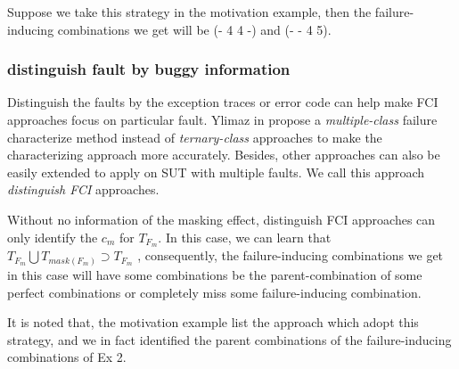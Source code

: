 \documentclass{sig-alternate}
\begin{document}
Suppose we take this strategy in the motivation example, then the failure-inducing combinations we get will be (- 4 4 -) and (- - 4 5).

\subsubsection{distinguish fault by buggy information}
Distinguish the faults by the exception traces or error code can help make FCI approaches focus on particular fault. Ylimaz in  \cite{yilmaz2013reducing} propose a \emph{multiple-class} failure characterize method instead of \emph{ternary-class} approaches to make the characterizing approach more accurately. Besides, other approaches can also be easily extended to apply on SUT with multiple faults. We call this approach \emph{distinguish FCI} approaches.

Without no information of the masking effect, distinguish FCI approaches can only identify the $c_{m}$ for $T_{F_{m}}$. In this case, we can learn that $T_{F_{m}} \bigcup T_{mask(F_{m})} \supset T_{F_{m}} $ , consequently, the failure-inducing combinations we get in this case will have some combinations be the parent-combination of some perfect combinations or completely miss some failure-inducing combination.

It is noted that, the motivation example list the approach which adopt this strategy, and we in fact identified the parent combinations of the failure-inducing combinations of Ex 2.
\end{document}
